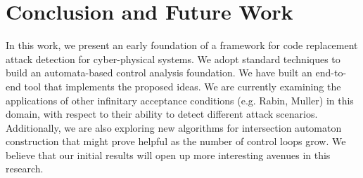 \section{Conclusion and Future Work} \label{sec7}
\noindent
In this work, we present an early foundation of a framework for code replacement attack detection for cyber-physical systems. We adopt standard techniques to build an automata-based control analysis foundation. We have built an end-to-end tool that implements the proposed ideas.  We are currently examining the applications of other infinitary acceptance conditions (e.g. Rabin, Muller) in this domain, with respect to their ability to detect different attack scenarios. Additionally, we are also exploring new algorithms for intersection automaton construction that might prove helpful as the number of control loops grow. We believe that our initial results will open up more interesting avenues in this research.